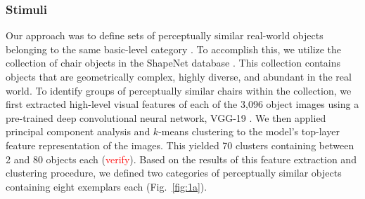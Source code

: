 \documentclass[10pt,letterpaper]{article}
\newcommand{\red}[1]{\textcolor{Red}{#1}}
\begin{document}
\subsubsection{Stimuli} 

Our approach was to define sets of perceptually similar real-world objects belonging to the same basic-level category \cite{MervisRosch81_CategorizationReview}.
To accomplish this, we utilize the collection of chair objects in the ShapeNet database \cite{chang2015shapenet}.
This collection contains objects that are geometrically complex, highly diverse, and abundant in the real world.
To identify groups of perceptually similar chairs within the collection, we first extracted high-level visual features of each of the 3,096 object images using a pre-trained deep convolutional neural network, VGG-19 \cite{simonyan2014very}. 
We then applied principal component analysis and $k$-means clustering to the model's top-layer feature representation of the images. 
This yielded 70 clusters containing between 2 and 80 objects each (\red{verify}).
Based on the results of this feature extraction and clustering procedure, we defined two categories of perceptually similar objects containing eight exemplars each (Fig.~\ref{fig:1a}). 


\end{document}
